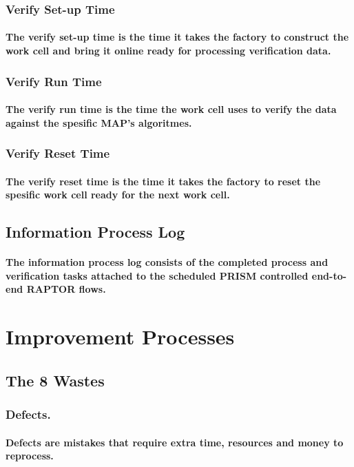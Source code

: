 \documentclass{acm_proc_article-sp}
\begin{document}
\subsubsection{Verify Set-up Time}
\paragraph{The verify set-up time is the time it takes the factory to construct the work cell and bring it online ready for processing verification data.}
\subsubsection{Verify Run Time}
\paragraph{The verify run time is the time the work cell uses to verify the data against the spesific MAP's algoritmes.}
\subsubsection{Verify Reset Time}
\paragraph{The verify reset time is the time it takes the factory to reset the spesific work cell ready for the next work cell.}
\subsection{Information Process Log}
\paragraph{The information process log consists of the completed process and verification tasks attached to the scheduled PRISM controlled end-to-end RAPTOR flows.}
\pagebreak
\section{Improvement Processes}
\subsection{The 8 Wastes}
\subsubsection{Defects.}
\paragraph{Defects are mistakes that require extra time, resources and money to reprocess.}
\end{document}
